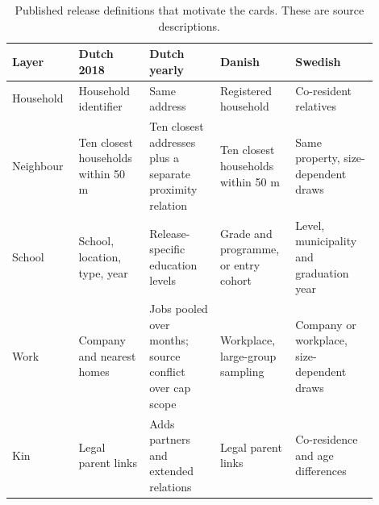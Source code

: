 \begin{table}[!htbp]
\centering\small
\caption{Published release definitions that motivate the cards. These are source descriptions.}
\label{tab:releases}
\begin{tabular}{@{} >{\raggedright\arraybackslash}p{0.15\linewidth} >{\raggedright\arraybackslash}p{0.18\linewidth} >{\raggedright\arraybackslash}p{0.18\linewidth} >{\raggedright\arraybackslash}p{0.18\linewidth} >{\raggedright\arraybackslash}p{0.21\linewidth} @{}}
\toprule
\rowcolor{tableblue} \textbf{Layer} & \textbf{Dutch 2018} & \textbf{Dutch yearly} & \textbf{Danish} & \textbf{Swedish} \\
\midrule
Household & Household identifier & Same address & Registered household & Co-resident relatives \\
Neighbour & Ten closest households within 50 m & Ten closest addresses plus a separate proximity relation & Ten closest households within 50 m & Same property, size-dependent draws \\
School & School, location, type, year & Release-specific education levels & Grade and programme, or entry cohort & Level, municipality and graduation year \\
Work & Company and nearest homes & Jobs pooled over months; source conflict over cap scope & Workplace, large-group sampling & Company or workplace, size-dependent draws \\
Kin & Legal parent links & Adds partners and extended relations & Legal parent links & Co-residence and age differences \\
\bottomrule
\end{tabular}
\end{table}
